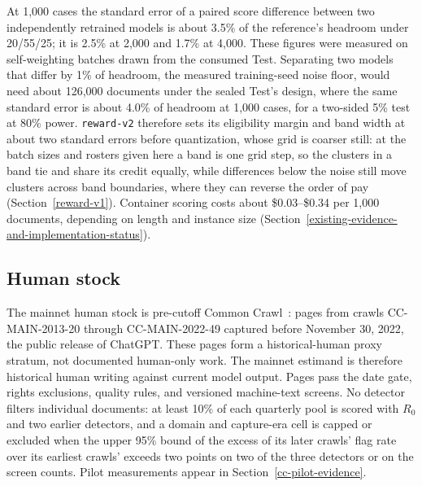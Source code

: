 At 1,000 cases the standard error of a paired score difference between two
independently retrained models is about 3.5\% of the reference's headroom under
20/55/25; it is 2.5\% at 2,000 and 1.7\% at 4,000. These figures were measured
on self-weighting batches drawn from the consumed Test. Separating two models
that differ by 1\% of headroom, the measured training-seed noise floor, would
need about 126,000 documents under the sealed Test's design, where the same
standard error is about 4.0\% of headroom at 1,000 cases, for a two-sided 5\%
test at 80\% power. \texttt{reward-v2} therefore sets its eligibility margin and
band width at about two standard errors before quantization, whose grid is
coarser still: at the batch sizes and rosters given here a band is one grid
step, so the clusters in a band tie and share its credit equally, while
differences below the noise still move clusters across band boundaries, where
they can reverse the order of pay (Section~\ref{reward-v1}). Container scoring costs about \$0.03--\$0.34 per
1,000 documents, depending on length and instance size
(Section~\ref{existing-evidence-and-implementation-status}).

\subsection{Human stock}\label{human-stock}

The mainnet human stock is pre-cutoff Common Crawl~\cite{commoncrawl}: pages
from crawls CC-MAIN-2013-20 through CC-MAIN-2022-49 captured before November 30,
2022, the public release of ChatGPT. These pages form a historical-human proxy
stratum, not documented human-only work. The mainnet estimand is therefore
historical human writing against current model output. Pages pass the date
gate, rights exclusions, quality rules, and versioned machine-text screens.
No detector filters individual documents: at least 10\% of each quarterly pool
is scored with \(R_0\) and two earlier detectors, and a domain and capture-era
cell is capped or excluded when the upper 95\% bound of the excess of its later
crawls' flag rate over its earliest crawls' exceeds two points on two of the
three detectors or on the screen counts. Pilot measurements appear in
Section~\ref{cc-pilot-evidence}.


